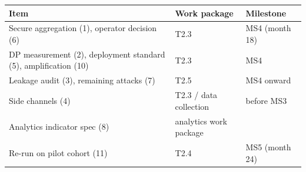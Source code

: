 \begin{center}
\small
\begin{tabular}{lll}
  \toprule
  Item & Work package & Milestone \\
  \midrule
  Secure aggregation (1), operator decision (6) & T2.3 & MS4 (month 18) \\
  DP measurement (2), deployment standard (5), amplification (10) & T2.3 & MS4 \\
  Leakage audit (3), remaining attacks (7) & T2.5 & MS4 onward \\
  Side channels (4) & T2.3 / data collection & before MS3 \\
  Analytics indicator spec (8) & analytics work package &  \\
  Re-run on pilot cohort (11) & T2.4 & MS5 (month 24) \\
  \bottomrule
\end{tabular}
\end{center}
